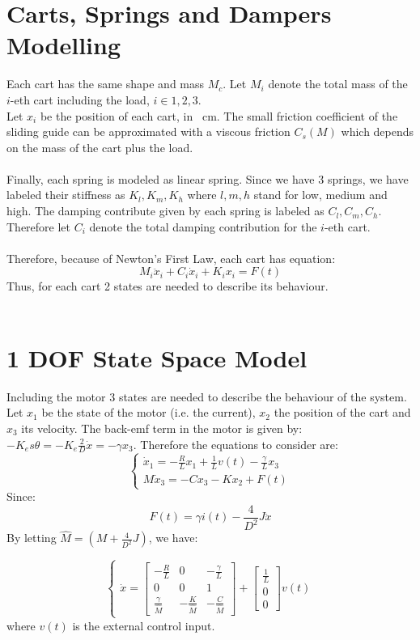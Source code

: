 \section{Carts, Springs and Dampers Modelling}
Each cart has the same shape and mass $M_{c}$. Let $M_{i}$ denote the total mass of the $i$-eth cart including the load, $i \in {1,2,3}$. \\
Let $x_{i}$ be the position of each cart, in \SI{}{\cm}. The small friction coefficient of the sliding guide can be approximated with a viscous friction $C_{s}(M)$ which depends on the mass of the cart plus the load. \\ \\
Finally, each spring is modeled as linear spring. Since we have 3 springs, we have labeled their stiffness as $K_l, K_m, K_h$ where $l,m,h$ stand for low, medium and high. The damping contribute given by each spring is labeled as $C_l, C_m, C_h$. Therefore let $C_{i}$ denote the total damping contribution for the $i$-eth cart.\\ \\
Therefore, because of Newton's First Law, each cart has equation:
$$M_i \ddot{x}_i + C_{i} \dot{x}_i + K_{i}x_{i}=F(t)$$
Thus, for each cart 2 states are needed to describe its behaviour.\\ \\
\section{1 DOF State Space Model}
Including the motor 3 states are needed to describe the behaviour of the system. Let $x_{1}$ be the state of the motor (i.e. the current), $x_{2}$ the position of the cart and $x_{3}$ its velocity. The back-emf term in the motor is given by: $-K_e s \theta = -K_e \frac{2}{D}\dot{x} = -\gamma x_3$. Therefore the equations to consider are:
\begin{equation}
\begin{cases}
\dot{x}_1 = -\frac{R}{L}x_{1}+\frac{1}{L} v(t)-\frac{\gamma}{L}x_3  \\
M\dot{x}_3 = -Cx_3 -K x_2 + F(t)
\end{cases}
\end{equation}
Since:
$$F(t)=\gamma i(t) - \frac{4}{D^2}J \ddot{x}$$
By letting $\hat{M} = (M+\frac{4}{D^2}J)$, we have:

\begin{equation}
\begin{cases}
\dot{x}=\begin{bmatrix}
-\frac{R}{L} &0 & -\frac{\gamma}{L} \\
0 & 0 & 1 \\ 
 \frac{\gamma}{\hat{M}} & -\frac{K}{\hat{M}} & -\frac{C}{\hat{M}}
\end{bmatrix}
+
\begin{bmatrix}\frac{1}{L} \\ 0 \\ 0\end{bmatrix} v(t)
\end{cases}
\end{equation}
where $v(t)$ is the external control input.
